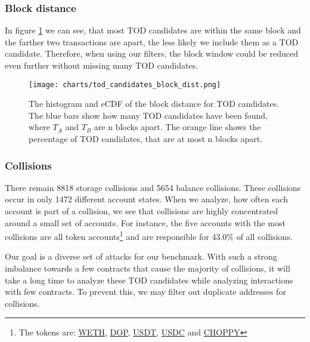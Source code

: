 \documentclass[draft,final]{vutinfth} %
\begin{document}
\subsubsection{Block distance}

In figure \ref{fig:tod_block_dist} we can see, that most TOD candidates are within the same block and the farther two transactions are apart, the less likely we include them as a TOD candidate. Therefore, when using our filters, the block window could be reduced even further without missing many TOD candidates.


\begin{figure}[h]
    \centering
    \texttt{[image: charts/tod\_candidates\_block\_dist.png]}
    \caption[Block distances of TOD candidates]{The histogram and eCDF of the block distance for TOD candidates. The blue bars show how many TOD candidates have been found, where $T_A$ and $T_B$ are n blocks apart. The orange line shows the percentage of TOD candidates, that are at most n blocks apart.}
    \label{fig:tod_block_dist}
\end{figure}

\subsubsection{Collisions}

There remain 8818 storage collisions and 5654 balance collisions. These collisions occur in only 1472 different account states. When we analyze, how often each account is part of a collision, we see that collisions are highly concentrated around a small set of accounts. For instance, the five accounts with the most collisions are all token accounts\footnote{The tokens are: \href{https://etherscan.io/address/0xc02aaa39b223fe8d0a0e5c4f27ead9083c756cc2}{WETH}, \href{https://etherscan.io/address/0x97a9a15168c22b3c137e6381037e1499c8ad0978}{DOP}, \href{https://etherscan.io/address/0xdac17f958d2ee523a2206206994597c13d831ec7}{USDT}, \href{https://etherscan.io/address/0xa0b86991c6218b36c1d19d4a2e9eb0ce3606eb48}{USDC} and \href{https://etherscan.io/address/0xf938346d7117534222b48d09325a6b8162b3a9e7}{CHOPPY}} and are responsible for 43.0\% of all collisions.

Our goal is a diverse set of attacks for our benchmark. With such a strong imbalance towards a few contracts that cause the majority of collisions, it will take a long time to analyze these TOD candidates while analyzing interactions with few contracts. To prevent this, we may filter out duplicate addresses for collisions.
\end{document}
